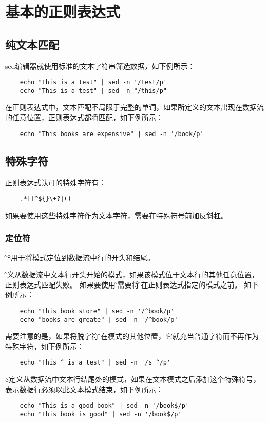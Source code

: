 \documentclass[a4paper,left=2.5cm,right=2.5cm,11pt]{article}
\begin{document}
\tableofcontents

\clearpage

\section{基本的正则表达式}
\subsection{纯文本匹配}
	sed编辑器就使用标准的文本字符串筛选数据，如下例所示：
	\begin{lstlisting}
	echo "This is a test" | sed -n '/test/p'
	echo "This is a test" | sed -n "/this/p"
	\end{lstlisting}

	在正则表达式中，文本匹配不局限于完整的单词，如果所定义的文本出现在数据流的任意位置，正则表达式都将匹配，如下例所示：
	\begin{lstlisting}
	echo "This books are expensive" | sed -n '/book/p'
	\end{lstlisting}

\subsection{特殊字符}
	正则表达式认可的特殊字符有：
	\begin{lstlisting}
	.*[]^${}\+?|()
	\end{lstlisting}

	如果要使用这些特殊字符作为文本字符，需要在特殊符号前加反斜杠。

\subsubsection{定位符}
	\^和\$用于将模式定位到数据流中行的开头和结尾。\par
	\^定义从数据流中文本行开头开始的模式，如果该模式位于文本行的其他任意位置，正则表达式匹配失败。
	如果要使用\^，需要将\^放在正则表达式指定的模式之前。
	如下例所示：
	\begin{lstlisting}
	echo "This book store" | sed -n '/^book/p'
	echo "books are greate" | sed -n '/^book/p'
	\end{lstlisting}

	需要注意的是，如果将脱字符\^放在模式的其他位置，它就充当普通字符而不再作为特殊字符，如下例所示：
	\begin{lstlisting}
	echo "This ^ is a test" | sed -n '/s ^/p'
	\end{lstlisting}

	\$定义从数据流中文本行结尾处的模式，如果在文本模式之后添加这个特殊符号，表示数据行必须以此文本模式结束，如下例所示：
	\begin{lstlisting}
	echo "This is a good book" | sed -n '/book$/p'
	echo "This book is good" | sed -n '/book$/p'
	\end{lstlisting}
\end{document}
